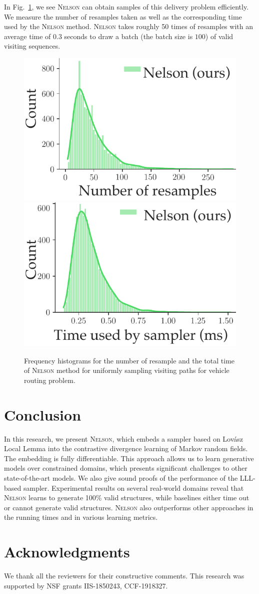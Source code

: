 \documentclass[letterpaper]{article} %
\newcommand{\lovasz}{{Lov\'asz}\xspace}
\newcommand{\nls}{\textsc{Nelson}\xspace}
\begin{document}
In Fig.~\ref{fig:route}, we see  \nls can obtain samples of this delivery problem efficiently. We measure the number of resamples taken as well as the corresponding time used  by the \nls method. \nls takes roughly 50 times of resamples with an average time of $0.3$ seconds to draw a batch (the batch size is $100$) of valid visiting sequences.

\begin{figure}[!t]
    \centering
    \includegraphics[width=0.495\linewidth]{exp/sat/vehicle.resamples.pdf}
    \includegraphics[width=0.495\linewidth]{exp/sat/vehicle.time.pdf}
    \caption{Frequency histograms for the number of resample and the total time of \nls method for uniformly sampling visiting paths for vehicle routing problem.}
    \label{fig:route}
\end{figure}

\section{Conclusion}
In this research, we present \nls, which  embeds a sampler based on \lovasz Local Lemma into the contrastive divergence learning of Markov random fields. The embedding is fully differentiable. This approach allows us to learn generative models over constrained domains, which presents significant challenges to other state-of-the-art models. 
We also give sound proofs of the performance of the LLL-based sampler.
%
Experimental results on several real-world domains reveal that \nls learns to generate 100\% valid structures, while baselines either time out or cannot generate valid structures. 
%
\nls also outperforms other approaches in the running times and in various learning metrics. 



\section{Acknowledgments}
We thank all the reviewers for their constructive comments. This research was supported by
NSF grants IIS-1850243, CCF-1918327. 


\appendix




\end{document}
